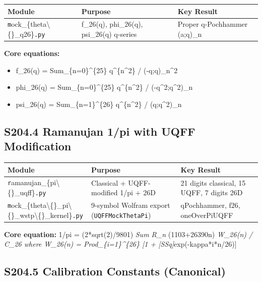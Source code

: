 \documentclass[11pt]{article}
\begin{document}
\begin{center}
\begin{longtable}{lll}
\toprule
Module & Purpose & Key Result \tabularnewline
\midrule
\endhead
\verb|m|ock\_\{theta\textbackslash\{\}\_q26\}\verb|.py| & f\_26(q), phi\_26(q), psi\_26(q) q-series & Proper q-Pochhammer (a;q)\_n \tabularnewline
\bottomrule
\end{longtable}
\end{center}

\textbf{Core equations:}

\begin{itemize}
  \item f\_26(q) = Sum\_\{n=0\}\textasciicircum{}\{25\} q\textasciicircum{}\{n\textasciicircum{}2\} / (-q;q)\_n\textasciicircum{}2
  \item phi\_26(q) = Sum\_\{n=0\}\textasciicircum{}\{25\} q\textasciicircum{}\{n\textasciicircum{}2\} / (-q\textasciicircum{}2;q\textasciicircum{}2)\_n
  \item psi\_26(q) = Sum\_\{n=1\}\textasciicircum{}\{26\} q\textasciicircum{}\{n\textasciicircum{}2\} / (q;q\textasciicircum{}2)\_n
\end{itemize}

\subsection*{S204.4 Ramanujan 1/pi with UQFF Modification}

\begin{center}
\begin{longtable}{lll}
\toprule
Module & Purpose & Key Result \tabularnewline
\midrule
\endhead
\verb|r|amanujan\_\{pi\textbackslash\{\}\_uqff\}\verb|.py| & Classical + UQFF-modified 1/pi + 26D & 21 digits classical, 15 UQFF, 7 digits 26D \tabularnewline
\verb|m|ock\_\{theta\textbackslash\{\}\_pi\textbackslash\{\}\_wstp\textbackslash\{\}\_kernel\}\verb|.py| & 9-symbol Wolfram export (\verb|UQFFMockThetaPi|) & qPochhammer, f26, oneOverPiUQFF \tabularnewline
\bottomrule
\end{longtable}
\end{center}

\textbf{Core equation:} 1/pi = (2*sqrt(2)/9801) \emph{ Sum R\_n } (1103+26390n) \emph{ W\_26(n) / C\_26 where W\_26(n) = Prod\_\{i=1\}\textasciicircum{}\{26\} [1 + [SSq]}exp(-kappa*i*n/26)]

\subsection*{S204.5 Calibration Constants (Canonical)}
\end{document}
